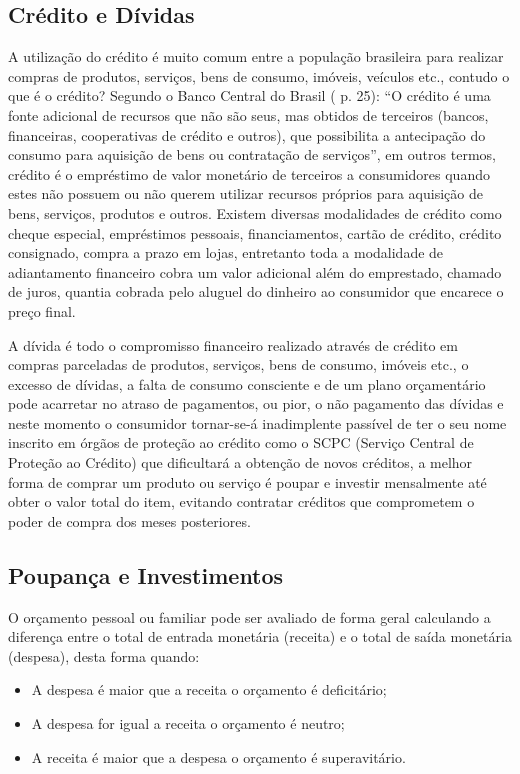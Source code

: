 \subsection{Crédito e Dívidas}
A utilização do crédito é muito comum entre a população brasileira para realizar compras de produtos, serviços, bens de consumo, imóveis, veículos etc., contudo o que é o crédito? Segundo o Banco Central do Brasil (\citeyear{bacen2013} p. 25): “O crédito é uma fonte adicional de recursos que não são seus, mas obtidos de terceiros (bancos, financeiras, cooperativas de crédito e outros), que possibilita a antecipação do consumo para aquisição de bens ou contratação de serviços”, em outros termos, crédito é o empréstimo de valor monetário de terceiros a consumidores quando estes não possuem ou não querem utilizar recursos próprios para aquisição de bens, serviços, produtos e outros. Existem diversas modalidades de crédito como cheque especial, empréstimos pessoais, financiamentos, cartão de crédito, crédito consignado, compra a prazo em lojas, entretanto toda a modalidade de adiantamento financeiro cobra um valor adicional além do emprestado, chamado de juros, quantia cobrada pelo aluguel do dinheiro ao consumidor que encarece o preço final.

A dívida é todo o compromisso financeiro realizado através de crédito em compras parceladas de produtos, serviços, bens de consumo, imóveis etc., o excesso de dívidas, a falta de consumo consciente e de um plano orçamentário pode acarretar  no atraso de pagamentos, ou pior, o não pagamento das dívidas e neste momento o consumidor tornar-se-á inadimplente passível de ter o seu nome inscrito em órgãos de proteção ao crédito como o SCPC (Serviço Central de Proteção ao Crédito) que dificultará a obtenção de novos créditos, a melhor forma de comprar um produto ou serviço é poupar e investir mensalmente até obter o valor total do item, evitando contratar créditos que comprometem o poder de compra dos meses posteriores.

\subsection{Poupança e Investimentos}
O orçamento pessoal ou familiar pode ser avaliado de forma geral calculando a diferença entre o total de entrada monetária (receita) e o total de saída monetária (despesa), desta forma quando:
\begin{itemize}
    \item A despesa é maior que a receita o orçamento é deficitário;
    \item A despesa for igual a receita o orçamento é neutro;
    \item A receita é maior que a despesa o orçamento é superavitário.
\end{itemize}

